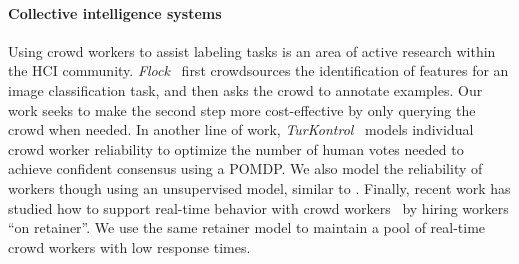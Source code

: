 
\paragraph{Collective intelligence systems}

Using crowd workers to assist labeling tasks is an area of active research within the HCI community.
\textit{Flock}~\cite{chengflock} first crowdsources the identification of features for an image classification task, and then asks the crowd to annotate examples.
Our work seeks to make the second step more cost-effective by only querying the crowd when needed.
In another line of work, \textit{TurKontrol}~\cite{peng2010decision} models individual crowd worker reliability to optimize the number of human votes needed to achieve confident consensus using a POMDP.
We also model the reliability of workers though using an unsupervised model, similar to .
Finally, recent work has studied how to support real-time behavior with crowd workers~\cite{bernstein2011crowds,lasecki2013real} by hiring workers ``on retainer''.
We use the same retainer model to maintain a pool of real-time crowd workers with low response times.


